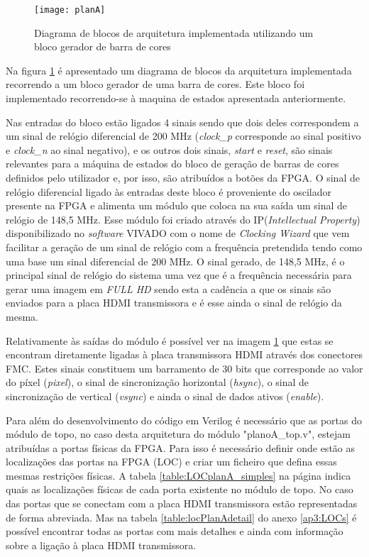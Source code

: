 \begin{figure}[h!]
	\begin{center}
		\leavevmode
		\texttt{[image: planA]}
		\caption{Diagrama de blocos de arquitetura implementada utilizando um bloco gerador de barra de cores}
		\label{fig:planA}
	\end{center}
\end{figure}

Na figura \ref{fig:planA} é apresentado um diagrama de blocos da arquitetura implementada recorrendo a um bloco gerador de uma barra de cores. Este bloco foi implementado recorrendo-se à maquina de estados apresentada anteriormente.

Nas entradas do bloco estão ligados 4 sinais sendo que dois deles correspondem a um sinal de relógio diferencial de 200 MHz (\textit{clock\_p} corresponde ao sinal positivo e \textit{clock\_n} ao sinal negativo), e os outros dois sinais, \textit{start} e \textit{reset}, são sinais relevantes para a máquina de estados do bloco de geração de barras de cores definidos pelo utilizador e, por isso, são atribuídos a botões da FPGA. O sinal de relógio diferencial ligado às entradas deste bloco é proveniente do oscilador presente na FPGA e alimenta um módulo que coloca na sua saída um sinal de relógio de 148,5 MHz. Esse módulo foi criado através do IP(\textit{Intellectual Property}) disponibilizado no \textit{software} VIVADO com o nome de \textit{Clocking Wizard} que vem facilitar a geração de um sinal de relógio com a frequência pretendida tendo como uma base um sinal diferencial de 200 MHz. O sinal gerado, de 148,5 MHz, é o principal sinal de relógio do sistema uma vez que é a frequência necessária para gerar uma imagem em \textit{FULL HD} sendo esta a cadência a que os sinais são enviados para a placa HDMI transmissora e é esse ainda o sinal de relógio da mesma.

Relativamente às saídas do módulo é possível ver na imagem \ref{fig:planA} que estas se encontram diretamente ligadas à placa transmissora HDMI através dos conectores FMC. Estes sinais constituem um barramento de 30 bits que corresponde ao valor do píxel (\textit{pixel}), o sinal de sincronização horizontal (\textit{hsync}), o sinal de sincronização de vertical (\textit{vsync}) e ainda o sinal de dados ativos (\textit{enable}).

Para além do desenvolvimento do código em Verilog é necessário que as portas do módulo de topo, no caso desta arquitetura do módulo "planoA\_top.v", estejam atribuídas a portas físicas da FPGA. Para isso é necessário definir onde estão as localizações das portas na FPGA (LOC) e criar um ficheiro que defina essas mesmas restrições físicas. A tabela \ref{table:LOCplanA_simples} na página \pageref{table:LOCplanA_simples} indica quais as localizações físicas de cada porta existente no módulo de topo. No caso das portas que se conectam com a placa HDMI transmissora estão representadas de forma abreviada. Mas na tabela \ref{table:locPlanAdetail} do anexo \ref{ap3:LOCs} é possível encontrar todas as portas com mais detalhes e ainda com informação sobre a ligação à placa HDMI transmissora.

